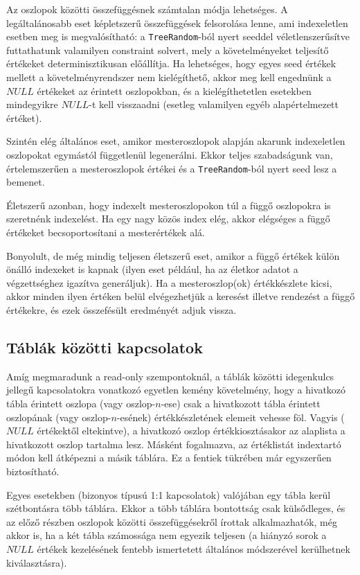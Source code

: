 \documentclass[
    parspace,
    noindent,
    nohyp,
]{elteiktdk}[2023/04/10]
\begin{document}
Az oszlopok közötti összefüggésnek számtalan módja lehetséges.
A legáltalánosabb eset képletszerű összefüggések felsorolása lenne,
ami indexeletlen esetben meg is megvalósítható:
a \texttt{TreeRandom}-ból nyert seeddel véletlenszerűsítve futtathatunk valamilyen constraint solvert,
mely a követelményeket teljesítő értékeket determinisztikusan előállítja.
Ha lehetséges, hogy egyes seed értékek mellett a követelményrendszer nem kielégíthető,
akkor meg kell engednünk a $NULL$ értékeket az érintett oszlopokban,
és a kielégíthetetlen esetekben mindegyikre $NULL$-t kell visszaadni
(esetleg valamilyen egyéb alapértelmezett értéket).

Szintén elég általános eset, amikor mesteroszlopok
alapján akarunk indexeletlen oszlopokat egymástól függetlenül legenerálni.
Ekkor teljes szabadságunk van,
értelemszerűen a mesteroszlopok értékei és a \texttt{TreeRandom}-ból nyert seed lesz a bemenet.

Életszerű azonban, hogy indexelt mesteroszlopokon túl
a függő oszlopokra is szeretnénk indexelést.
Ha egy nagy közös index elég,
akkor elégséges a függő értékeket becsoportosítani a mesterértékek alá.

Bonyolult, de még mindig teljesen életszerű eset,
amikor a függő értékek külön önálló indexeket is kapnak
(ilyen eset például, ha az életkor adatot a végzettséghez igazítva generáljuk).
Ha a mesteroszlop(ok) értékkészlete kicsi,
akkor minden ilyen értéken belül elvégezhetjük a keresést illetve rendezést a függő értékekre,
és ezek összefésült eredményét adjuk vissza.

\subsection{Táblák közötti kapcsolatok}

Amíg megmaradunk a read-only szempontoknál,
a táblák közötti idegenkulcs jellegű kapcsolatokra vonatkozó egyetlen kemény követelmény,
hogy a hivatkozó tábla érintett oszlopa (vagy oszlop-$n$-ese)
csak a hivatkozott tábla érintett oszlopának (vagy oszlop-$n$-esének) 
értékkészletének elemeit vehesse föl.
Vagyis ($NULL$ értékektől eltekintve),
a hivatkozó oszlop értékkiosztásakor az alaplista a hivatkozott oszlop tartalma lesz.
Másként fogalmazva, az értéklistát indextartó módon kell átképezni a másik táblára.
Ez a fentiek tükrében már egyszerűen biztosítható.

Egyes esetekben (bizonyos típusú 1:1 kapcsolatok) valójában egy tábla kerül szétbontásra több táblára.
Ekkor a több táblára bontottság csak külsődleges,
és az előző részben oszlopok közötti összefüggésekről írottak alkalmazhatók,
még akkor is, ha a két tábla számossága nem egyezik teljesen
(a hiányzó sorok a $NULL$ értékek kezelésének fentebb ismertetett
általános módszerével kerülhetnek kiválasztásra).
\end{document}
